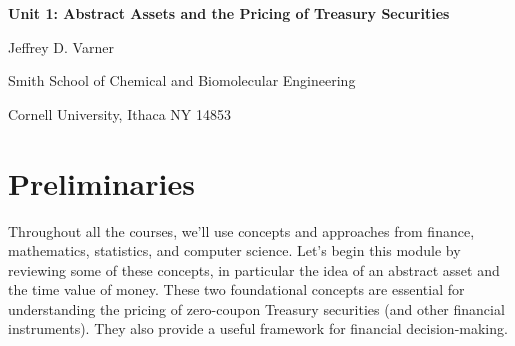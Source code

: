 \documentclass[11pt]{article}
\theoremstyle{definition}
\begin{document}
{\par\centering\textbf{\Large Unit 1: Abstract Assets and the Pricing of Treasury Securities}}
\vspace{0.2in}
{\par \centering \large{Jeffrey D. Varner}}
\vspace{0.05in}
{\par \centering \large{Smith School of Chemical and Biomolecular Engineering}}
{\par \centering \large{Cornell University, Ithaca NY 14853}}

\date{}
\thispagestyle{empty}

\setcounter{page}{1}

\tableofcontents
\clearpage
\listoffigures
\clearpage
\listofalgorithms
\clearpage

\section{Preliminaries}
Throughout all the courses, we'll use concepts and approaches from finance, mathematics, statistics, and computer science.
Let's begin this module by reviewing some of these concepts, in particular the idea of an abstract asset and the time value of money.
These two foundational concepts are essential for understanding the pricing of zero-coupon Treasury securities (and other financial instruments).
They also provide a useful framework for financial decision-making.
\end{document}
